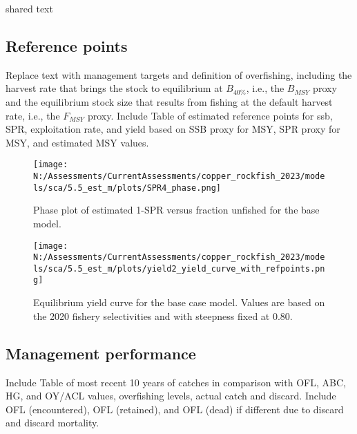 \documentclass[11pt,
  english,
  letterpaper,
]{article}
\begin{document}
shared text

\hypertarget{reference-points}{%
\subsection*{Reference points}\label{reference-points}}

Replace text with management targets and definition of overfishing, including the harvest rate that brings the stock to equilibrium at \(B_{40\%}\), i.e., the \(B_{MSY}\) proxy and the equilibrium stock size that results from fishing at the default harvest rate, i.e., the \(F_{MSY}\) proxy. Include Table of estimated reference points for ssb, SPR, exploitation rate, and yield based on SSB proxy for MSY, SPR proxy for MSY, and estimated MSY values.



\begin{figure}
\centering
\texttt{[image: N:/Assessments/CurrentAssessments/copper\_rockfish\_2023/models/sca/5.5\_est\_m/plots/SPR4\_phase.png]}
\caption{Phase plot of estimated 1-SPR versus fraction unfished for the base model.\label{fig:es-phase}}
\end{figure}

\begin{figure}
\centering
\texttt{[image: N:/Assessments/CurrentAssessments/copper\_rockfish\_2023/models/sca/5.5\_est\_m/plots/yield2\_yield\_curve\_with\_refpoints.png]}
\caption{Equilibrium yield curve for the base case model. Values are based on the 2020 fishery selectivities and with steepness fixed at 0.80.\label{fig:es-yield}}
\end{figure}

\hypertarget{management-performance}{%
\subsection*{Management performance}\label{management-performance}}

Include Table of most recent 10 years of catches in comparison with OFL, ABC, HG, and OY/ACL values, overfishing levels, actual catch and discard. Include OFL (encountered), OFL (retained), and OFL (dead) if different due to discard and discard mortality.

\begingroup\fontsize{10}{12}\selectfont
\begingroup\fontsize{10}{12}\selectfont
\end{document}
